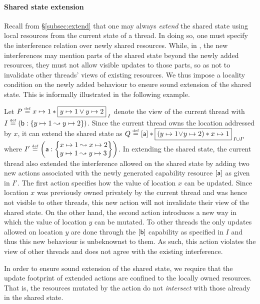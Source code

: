 \paragraph{Shared state extension}
Recall from \S\ref{subsec:extend} that one may always \emph{extend}
the shared state using local resources from the current state of a
thread. In doing so, one must specify the interference relation over
newly shared resources. While, in \colosl, the new interferences may
mention parts of the shared state beyond the newly added resources,
they must not allow visible updates to those parts, so as not to
invalidate other threads' views of existing resources. We thus impose
a locality condition on the newly added behaviour to ensure sound
extension of the shared state. This is informally illustrated in the
following example.
\begin{example}\label{ex:badExtension}
Let $P \eqdef \cell{x}{1} * \shared{\cell{y}{1} \lor \cell{y}{2}}{I}$ denote the view of the current thread with $I \mathrel{\stackrel{\smash{\scriptscriptstyle{\mathrm{def}}}}{=}} \left(\mathsf{b}: \left\{y \mapsto 1 \mathrel{\leadsto} y \mapsto 2\right\} \right)$. Since the current thread owns the location addressed by $x$, it can extend the shared state as $Q \eqdef [\token{a}] * \shared{\left(\cell{y}{1} \!\lor\! \cell{y}{2} \right) * \cell{x}{1}}{I \cup I'}$ where 
$
	I' \eqdef 
		\left(
			\token{a}: 
			\left\{
			\begin{array}{@{}l@{}} 
				\cell{x}{1} \swap \cell{x}{2}\\
				\cell{y}{1} \swap \cell{y}{3}
			\end{array}
			\right\}
		 \right)
$.
In extending the shared state, the current thread also extended the interference allowed on the shared state by adding two new actions associated with the newly generated capability resource $[\mathsf{a}]$ as given in $I'$. The first action specifies how the value of location $x$ can be updated. Since location $x$ was previously owned privately by the current thread and was hence not visible to other threads, this new action will not invalidate their view of the shared state. On the other hand, the second action introduces a new way in which the value of location $y$ can be mutated. To other threads the only updates allowed on location $y$ are done through the $[\mathsf{b}]$ capability as specified in $I$ and thus this new behaviour is unbeknownst to them. As such, this action violates the view of other threads and does not agree with the existing interference.
\end{example}
In order to ensure sound extension of the shared state, we require
that the update footprint of extended actions are confined to the
locally owned resources. That is, the resources mutated by the action
do not \emph{intersect} with those already in the shared state.



